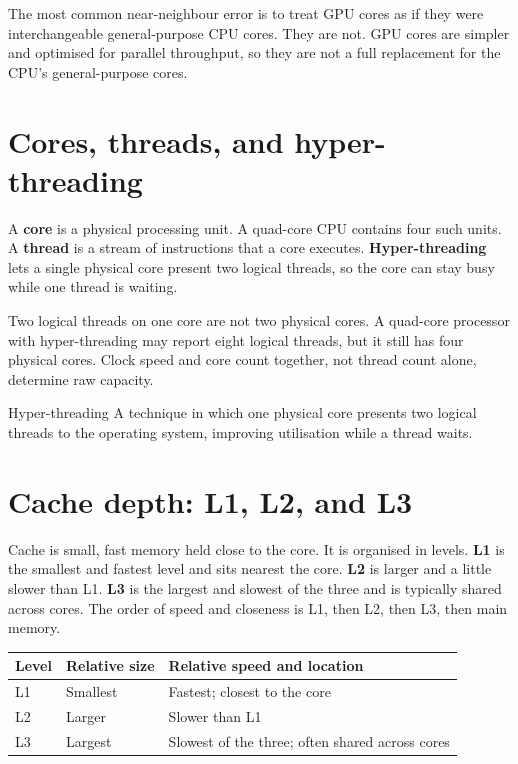 The most common near-neighbour error is to treat GPU cores as if they were
interchangeable general-purpose CPU cores. They are not. GPU cores are
simpler and optimised for parallel throughput, so they are not a full
replacement for the CPU's general-purpose cores.

\section{Cores, threads, and hyper-threading}
A \textbf{core} is a physical processing unit. A quad-core CPU contains four
such units. A \textbf{thread} is a stream of instructions that a core
executes. \textbf{Hyper-threading} lets a single physical core present two
logical threads, so the core can stay busy while one thread is waiting.

Two logical threads on one core are not two physical cores. A quad-core
processor with hyper-threading may report eight logical threads, but it still
has four physical cores. Clock speed and core count together, not thread
count alone, determine raw capacity.

\begin{definitionbox}{Hyper-threading}
A technique in which one physical core presents two logical threads to the
operating system, improving utilisation while a thread waits.
\end{definitionbox}

\section{Cache depth: L1, L2, and L3}
Cache is small, fast memory held close to the core. It is organised in levels.
\textbf{L1} is the smallest and fastest level and sits nearest the core.
\textbf{L2} is larger and a little slower than L1. \textbf{L3} is the largest
and slowest of the three and is typically shared across cores. The order of
speed and closeness is L1, then L2, then L3, then main memory.

\begin{center}
\begin{tabular}{p{}p{}p{}}
\toprule
\textbf{Level} & \textbf{Relative size} & \textbf{Relative speed and location}\\
\midrule
L1 & Smallest & Fastest; closest to the core\\
L2 & Larger & Slower than L1\\
L3 & Largest & Slowest of the three; often shared across cores\\
\bottomrule
\end{tabular}
\end{center}

